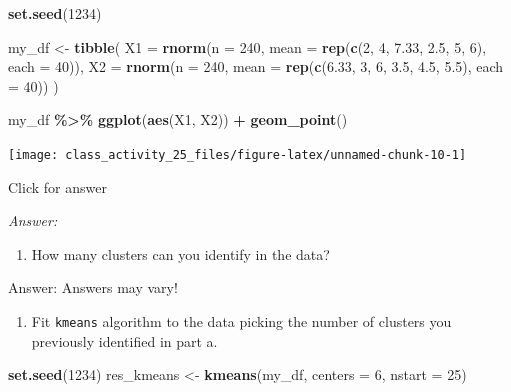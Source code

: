 \documentclass[
]{book}
\newenvironment{Shaded}{\begin{snugshade}}{\end{snugshade}}
\newcommand{\AttributeTok}[1]{\textcolor[rgb]{0.13,0.29,0.53}{#1}}
\newcommand{\DecValTok}[1]{\textcolor[rgb]{0.00,0.00,0.81}{#1}}
\newcommand{\FloatTok}[1]{\textcolor[rgb]{0.00,0.00,0.81}{#1}}
\newcommand{\FunctionTok}[1]{\textcolor[rgb]{0.13,0.29,0.53}{\textbf{#1}}}
\newcommand{\NormalTok}[1]{#1}
\newcommand{\OtherTok}[1]{\textcolor[rgb]{0.56,0.35,0.01}{#1}}
\newcommand{\SpecialCharTok}[1]{\textcolor[rgb]{0.81,0.36,0.00}{\textbf{#1}}}
\providecommand{\tightlist}{%
  \setlength{\itemsep}{0pt}\setlength{\parskip}{0pt}}
\begin{document}
\begin{Shaded}
\begin{Highlighting}[]
\FunctionTok{set.seed}\NormalTok{(}\DecValTok{1234}\NormalTok{)}

\NormalTok{my\_df }\OtherTok{\textless{}{-}} \FunctionTok{tibble}\NormalTok{(}
  \AttributeTok{X1 =} \FunctionTok{rnorm}\NormalTok{(}\AttributeTok{n =} \DecValTok{240}\NormalTok{, }\AttributeTok{mean =} \FunctionTok{rep}\NormalTok{(}\FunctionTok{c}\NormalTok{(}\DecValTok{2}\NormalTok{, }\DecValTok{4}\NormalTok{, }\FloatTok{7.33}\NormalTok{, }\FloatTok{2.5}\NormalTok{, }\DecValTok{5}\NormalTok{, }\DecValTok{6}\NormalTok{), }\AttributeTok{each =} \DecValTok{40}\NormalTok{)),}
  \AttributeTok{X2 =} \FunctionTok{rnorm}\NormalTok{(}\AttributeTok{n =} \DecValTok{240}\NormalTok{, }\AttributeTok{mean =} \FunctionTok{rep}\NormalTok{(}\FunctionTok{c}\NormalTok{(}\FloatTok{6.33}\NormalTok{, }\DecValTok{3}\NormalTok{, }\DecValTok{6}\NormalTok{, }\FloatTok{3.5}\NormalTok{, }\FloatTok{4.5}\NormalTok{, }\FloatTok{5.5}\NormalTok{), }\AttributeTok{each =} \DecValTok{40}\NormalTok{))}
\NormalTok{)}

\NormalTok{my\_df }\SpecialCharTok{\%\textgreater{}\%}
  \FunctionTok{ggplot}\NormalTok{(}\FunctionTok{aes}\NormalTok{(X1, X2)) }\SpecialCharTok{+}
  \FunctionTok{geom\_point}\NormalTok{() }
\end{Highlighting}
\end{Shaded}

\texttt{[image: class\_activity\_25\_files/figure-latex/unnamed-chunk-10-1]}

Click for answer

\emph{Answer:}

\begin{enumerate}
\def\labelenumi{\alph{enumi}.}
\tightlist
\item
  How many clusters can you identify in the data?
\end{enumerate}

Answer: Answers may vary!

\begin{enumerate}
\def\labelenumi{\alph{enumi}.}
\setcounter{enumi}{1}
\tightlist
\item
  Fit \texttt{kmeans} algorithm to the data picking the number of clusters you previously identified in part a.
\end{enumerate}

\begin{Shaded}
\begin{Highlighting}[]
\FunctionTok{set.seed}\NormalTok{(}\DecValTok{1234}\NormalTok{)}
\NormalTok{res\_kmeans }\OtherTok{\textless{}{-}} \FunctionTok{kmeans}\NormalTok{(my\_df, }\AttributeTok{centers =} \DecValTok{6}\NormalTok{, }\AttributeTok{nstart =} \DecValTok{25}\NormalTok{)}
\end{Highlighting}
\end{Shaded}
\end{document}
